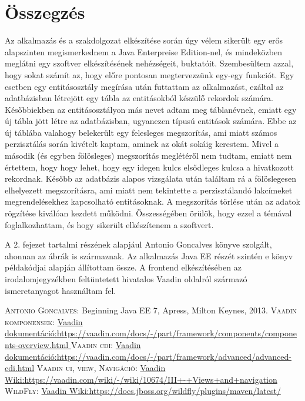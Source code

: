 \documentclass[centeredchapter]{thesis-ekf}
\theoremstyle{definition}
\theoremstyle{remark}
\begin{document}
\hypertarget{figure-datasource-beallitas}{}



\chapter{Összegzés}

Az alkalmazás és a szakdolgozat elkészítése során úgy vélem sikerült egy erős alapszinten megismerkednem a Java Enterpreise Edition-nel, és mindeközben meglátni egy szoftver elkészítésének nehézségeit, buktatóit. Szembesültem azzal, hogy sokat számít az, hogy előre pontosan megtervezzünk egy-egy funkciót. Egy esetben egy entitásosztály megírása után futtattam az alkalmazást, ezáltal az adatbázisban létrejött egy tábla az entitásokból készülő rekordok számára. Későbbiekben az entitásosztályon más nevet adtam meg táblanévnek, emiatt egy új tábla jött létre az adatbázisban, ugyanezen típusú entitások számára. Ebbe az új táblába valahogy belekerült egy felesleges megszorítás, ami miatt számos perzisztálás során kivételt kaptam, aminek az okát sokáig kerestem. Mivel a második (és egyben fölösleges) megszorítás meglétéről nem tudtam, emiatt nem értettem, hogy hogy lehet, hogy egy idegen kulcs elsődleges kulcsa a hivatkozott rekordnak. Később az adatbázis alapos vizsgálata után találtam rá a fölöslegesen elhelyezett megszorításra, ami miatt nem tekintette a perzisztálandó lakcímeket megrendelésekhez kapcsolható entitásoknak. A megszorítás törlése után az adatok rögzítése kiválóan kezdett működni.
Összességében örülök, hogy ezzel a témával foglalkozhattam, és hogy sikerült elkészítenem a szoftvert.

A 2. fejezet tartalmi részének alapjául Antonio Goncalves könyve szolgált, ahonnan az ábrák is származnak.
Az alkalmazás Java EE részét szintén e könyv példakódjai alapján állítottam össze.
A frontend elkészítésében az irodalomjegyzékben feltüntetett hivatalos Vaadin oldalról származó ismeretanyagot használtam fel.


\begin{thebibliography}{1}
 \textsc{Antonio Goncalves}: Beginning Java EE 7, Apress, Milton Keynes, 2013.
 \textsc{Vaadin komponensek}: \href{https://vaadin.com/docs/-/part/framework/components/components-overview.html}{Vaadin dokumentáció:\newline https://vaadin.com/docs/-/part/framework/components/components-overview.html }
 \textsc{Vaadin cdi}: \href{https://vaadin.com/docs/-/part/framework/advanced/advanced-cdi.html}{Vaadin dokumentáció:\newline https://vaadin.com/docs/-/part/framework/advanced/advanced-cdi.html}
 \textsc{Vaadin ui, view, Navigáció}: \href{https://vaadin.com/wiki/-/wiki/10674/III+-+Views+and+navigation}{Vaadin Wiki:\newline https://vaadin.com/wiki/-/wiki/10674/III+-+Views+and+navigation}
 \textsc{WildFly}: \href{https://docs.jboss.org/wildfly/plugins/maven/latest/}{Vaadin Wiki:\newline https://docs.jboss.org/wildfly/plugins/maven/latest/}

\end{thebibliography}
\end{document}
